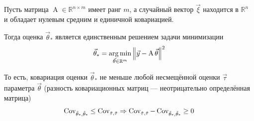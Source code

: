 \begin{theorem}
    \label{theorem:gaussMarkov}
    Пусть матрица $\operatorname{A} \in \mathbb{R}^{n \times m}$ имеет ранг $m$,
    а случайный вектор $\vec{\xi}$ находится в $\mathbb{R}^n$ и обладает нулевым
    средним и единичной ковариацией.

    Тогда оценка $\vec{\theta}_*$ является единственным решением задачи
    минимизации
    \begin{align*}
        \vec{\theta}_*
        = \argminof{\left\| \vec{y} - \operatorname{A} \vec{\theta} \right\|^2}{
            \vec{\theta} \in \mathbb{R}^m}
    \end{align*}

    То есть, ковариация оценки $\vec{\theta}_*$ не меньше любой несмещённой
    оценки $\vec{\tau}$ параметра $\vec{\theta}$ (разность
    ковариационных матриц --- неотрицательно определённая матрица)
    \begin{align*}
        \dCov{\vec{\theta}_*} \le \dCov{\vec{\tau}}
        \Rightarrow \dCov{\vec{\tau}} - \dCov{\vec{\theta}_*} \ge 0
    \end{align*}
\end{theorem}
